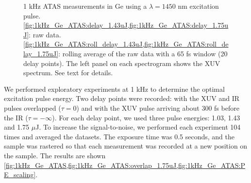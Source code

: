 \begin{figure}
	\qquad
	\caption{1 kHz ATAS measurements in Ge using a $\lambda = 1450 \text{ nm}$ excitation pulse.  \cref{fig:1kHz_Ge_ATAS:delay_1.43uJ,fig:1kHz_Ge_ATAS:delay_1.75uJ}: raw data. \cref{fig:1kHz_Ge_ATAS:roll_delay_1.43uJ,fig:1kHz_Ge_ATAS:roll_delay_1.75uJ}: rolling average of the raw data with a 65 fs window (20 delay points). The left panel on each spectrogram shows the XUV spectrum. See text for details.}
	\label{fig:1kHz_Ge_ATAS:delay}
\end{figure}

We performed exploratory experiments at 1 kHz to determine the optimal excitation pulse energy. Two delay points were recorded: with the XUV and IR pulses overlapped ($\tau = 0$) and with the XUV pulse arriving about 300 fs before the IR ($\tau = -\infty$). For each delay point, we used three pulse energies: 1.03, 1.43 and 1.75 $\mu$J. To increase the signal-to-noise, we performed each experiment 104 times and averaged the datasets. The exposure time was 0.5 seconds, and the sample was rastered so that each measurement was recorded at a new position on the sample. The results are shown \cref{fig:1kHz_Ge_ATAS,fig:1kHz_Ge_ATAS:overlap_1.75uJ,fig:1kHz_Ge_ATAS:PE_scaling}. 

